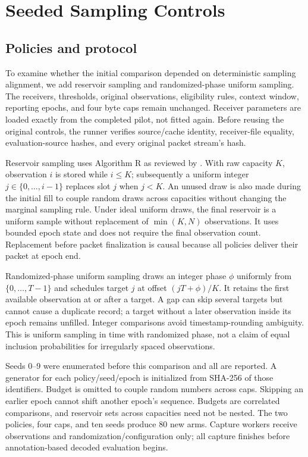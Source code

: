 \section{Seeded Sampling Controls}
\label{sec:seeded}
\subsection{Policies and protocol}
To examine whether the initial comparison depended on deterministic sampling
alignment, we add reservoir sampling and randomized-phase uniform sampling.
The receivers, thresholds, original observations, eligibility rules, context
window, reporting epochs, and four byte caps remain unchanged. Receiver parameters
are loaded exactly from the completed pilot, not fitted again. Before reusing the
original controls, the runner verifies source/cache identity, receiver-file equality,
evaluation-source hashes, and every original packet stream's hash.

Reservoir sampling uses Algorithm R as reviewed by
\citet{vitter1985reservoir}. With raw capacity $K$, observation $i$ is stored while
$i\leq K$; subsequently a uniform integer $j\in\{0,\ldots,i-1\}$ replaces slot
$j$ when $j<K$. An unused draw is also made during the initial fill to couple
random draws across capacities without changing the marginal sampling rule.
Under ideal uniform draws, the final reservoir is a uniform sample without
replacement of $\min(K,N)$ observations. It uses bounded epoch state and does not
require the final observation count. Replacement before packet finalization is
causal because all policies deliver their packet at epoch end.

Randomized-phase uniform sampling draws an integer phase $\phi$ uniformly from
$\{0,\ldots,T-1\}$ and schedules target $j$ at offset $(jT+\phi)/K$. It retains
the first available observation at or after a target. A gap can skip several
targets but cannot cause a duplicate record; a target without a later observation
inside its epoch remains unfilled. Integer comparisons avoid timestamp-rounding
ambiguity. This is uniform sampling in time with randomized phase, not a claim
of equal inclusion probabilities for irregularly spaced observations.

Seeds 0--9 were enumerated before this comparison and all are reported. A generator
for each policy/seed/epoch is initialized from SHA-256 of those identifiers.
Budget is omitted to couple random numbers across caps. Skipping an earlier epoch
cannot shift another epoch's sequence. Budgets are correlated comparisons, and
reservoir sets across capacities need not be nested. The two policies, four caps,
and ten seeds produce 80 new arms. Capture workers receive observations and
randomization/configuration only; all capture finishes before annotation-based
decoded evaluation begins.

